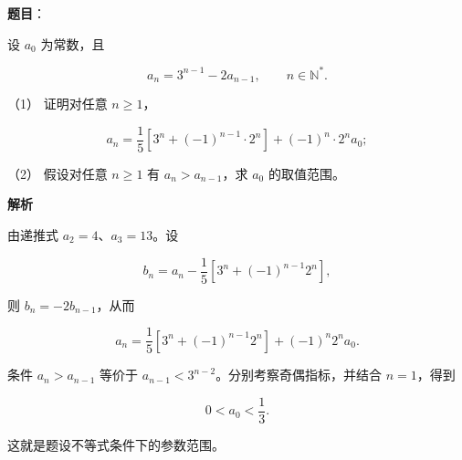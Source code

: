 \begin{answer}

\textbf{题目}：

设 $a_0$ 为常数，且

\nopagebreak[4]
\[
a_n=3^{n-1}-2a_{n-1},\qquad n\in\mathbb N^*.
\]

（1） 证明对任意 $n\geqslant1$，

\nopagebreak[4]
\[
a_n=\frac15\left[3^n+(-1)^{n-1}\cdot2^n\right]+(-1)^n\cdot2^n a_0;
\]

（2） 假设对任意 $n\geqslant1$ 有 $a_n>a_{n-1}$，求 $a_0$ 的取值范围。

\textbf{解析}


由递推式 $a_2=4\text{、}a_3=13$。设

\nopagebreak[4]
\[
b_n=a_n-\frac15\left[3^n+(-1)^{n-1}2^n\right],
\]

则 $b_n=-2b_{n-1}$，从而

\nopagebreak[4]
\[
a_n=\frac15\left[3^n+(-1)^{n-1}2^n\right]+(-1)^n2^na_0.
\]

条件 $a_n>a_{n-1}$ 等价于 $a_{n-1}<3^{n-2}$。分别考察奇偶指标，并结合 $n=1$，得到

\nopagebreak[4]
\[
0<a_0<\frac13.
\]


这就是题设不等式条件下的参数范围。



\end{answer}